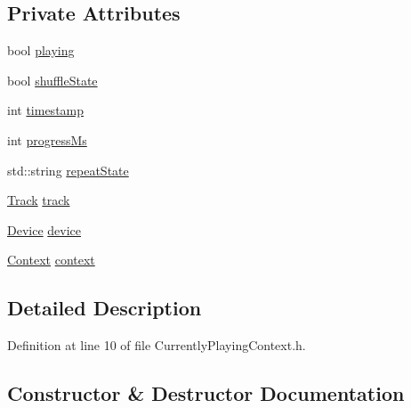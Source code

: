 \subsection*{Private Attributes}
\begin{DoxyCompactItemize}
\item 
bool \mbox{\hyperlink{class_currently_playing_context_ad9d6cfae749932039bccdeac9c03eb56}{playing}}
\item 
bool \mbox{\hyperlink{class_currently_playing_context_a4d41d4c9fd06cfdf21236a69ea55419e}{shuffle\+State}}
\item 
int \mbox{\hyperlink{class_currently_playing_context_a391a3e551b489457c722fcee606412e8}{timestamp}}
\item 
int \mbox{\hyperlink{class_currently_playing_context_a2e4843ac87122e82a775341eb3bf01e5}{progress\+Ms}}
\item 
std\+::string \mbox{\hyperlink{class_currently_playing_context_a05c89869416e50c9a535e8b61bd2a845}{repeat\+State}}
\item 
\mbox{\hyperlink{class_track}{Track}} \mbox{\hyperlink{class_currently_playing_context_a840cce2522aec1b8cf2ecd0f675d516c}{track}}
\item 
\mbox{\hyperlink{class_device}{Device}} \mbox{\hyperlink{class_currently_playing_context_a47c4a7aae38ef0dc36dde857d4347b06}{device}}
\item 
\mbox{\hyperlink{class_context}{Context}} \mbox{\hyperlink{class_currently_playing_context_a958130043de7b4f36b94b6f256fc4a68}{context}}
\end{DoxyCompactItemize}


\subsection{Detailed Description}


Definition at line 10 of file Currently\+Playing\+Context.\+h.



\subsection{Constructor \& Destructor Documentation}
\mbox{\label{class_currently_playing_context_a4eb10b196396f8766c6dc39b22a4eed5}} 
